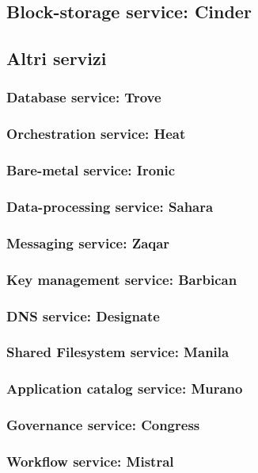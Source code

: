 \subsection{Block-storage service: Cinder}

\subsection{Altri servizi} 
\subsubsection{Database service: Trove}
\subsubsection{Orchestration service: Heat}
\subsubsection{Bare-metal service: Ironic}
\subsubsection{Data-processing service: Sahara}
\subsubsection{Messaging service: Zaqar}
\subsubsection{Key management service: Barbican}
\subsubsection{DNS service: Designate}
\subsubsection{Shared Filesystem service: Manila}
\subsubsection{Application catalog service: Murano}
\subsubsection{Governance service: Congress}
\subsubsection{Workflow service: Mistral}
